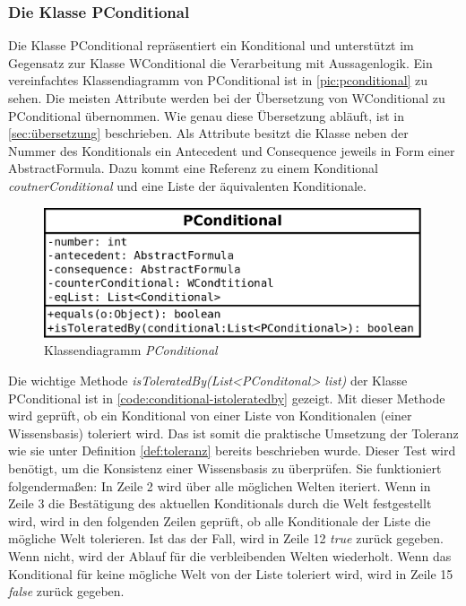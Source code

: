 \documentclass[12pt,a4paper]{article}
\begin{document}
\subsubsection{Die Klasse PConditional}
\label{sec:pconditional}





Die Klasse PConditional repräsentiert ein Konditional und unterstützt im Gegensatz zur Klasse WConditional die Verarbeitung mit Aussagenlogik. Ein vereinfachtes Klassendiagramm von PConditional ist in \autoref{pic:pconditional} zu sehen. Die meisten Attribute werden bei der Übersetzung von WConditional zu PConditional übernommen. Wie genau diese Übersetzung abläuft, ist in \autoref{sec:übersetzung} beschrieben. Als Attribute besitzt die Klasse neben der Nummer des Konditionals ein Antecedent und Consequence jeweils in Form einer AbstractFormula. Dazu kommt eine Referenz zu einem Konditional \textit{coutnerConditional} und eine Liste der äquivalenten Konditionale.


\begin{figure}
\includegraphics[width=0.55\linewidth]{bilder/PConditional.png}
\caption{Klassendiagramm \textit{PConditional}}
\label{pic:pconditional}
\end{figure}






Die wichtige Methode \textit{isToleratedBy(List<PConditonal> list)} der Klasse PConditional ist in \autoref{code:conditional-istoleratedby} gezeigt. Mit dieser Methode wird geprüft, ob ein Konditional von einer Liste von Konditionalen (einer Wissensbasis) toleriert wird. Das ist somit die praktische Umsetzung der Toleranz wie sie unter Definition \ref{def:toleranz} bereits beschrieben wurde. Dieser Test wird benötigt, um die Konsistenz einer Wissensbasis zu überprüfen. Sie funktioniert folgendermaßen: In Zeile 2 wird über alle möglichen Welten iteriert. Wenn in Zeile 3 die Bestätigung des aktuellen Konditionals durch die Welt festgestellt wird, wird in den folgenden Zeilen geprüft, ob alle Konditionale der Liste die mögliche Welt tolerieren. Ist das der Fall, wird in Zeile 12 \textit{true} zurück gegeben. Wenn nicht, wird der Ablauf für die verbleibenden Welten wiederholt. Wenn das Konditional für keine mögliche Welt von der Liste toleriert wird, wird in Zeile 15 \textit{false} zurück gegeben.
\end{document}
